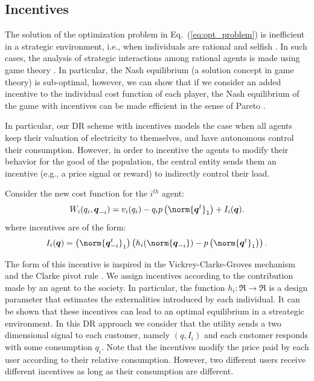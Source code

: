 \documentclass[a4paper,10pt]{article}
\newcommand{\bs}[1]{\boldsymbol{#1}}
\begin{document}
\subsection{Incentives}

The solution of the optimization problem in Eq.~(\ref{eq:opt_problem}) is inefficient in a strategic environment, i.e., when individuals are rational and selfish \cite{barreto_cdc, Johari09}. In such cases, the analysis of strategic interactions among rational agents is made using game theory \cite{fudenberg98}.
In particular, the Nash equilibrium (a solution concept in game theory)  is sub-optimal, however, we can show that if we consider an added incentive to the individual cost function of each player, the Nash equilibrium of the game with incentives can be made efficient in the sense of Pareto \cite{barreto_cdc}. 

In particular, our DR scheme with incentives models the case when all agents keep their valuation of electricity to themselves, and have autonomous control their consumption. However, in order to incentive the agents to modify their behavior for the good of the population, the central entity sends them an incentive (e.g., a price signal or reward) to indirectly control their load.

Consider the new cost function for the $i^{th}$ agent:
\begin{equation}\label{eq:game2}
W_i(q_i,\bs{q}_{-i}) 
= v_i(q_i) -  q_i p\left( \norm{\bs{q}^t}_1 \right) + I_i(\bs{q}) .
\end{equation}
where incentives are of the form:
\begin{equation}\label{eq:I_i}
I_i(\bs{q}) = \left( \norm{\bs{q}_{-i}^t}_1\right) \left( h_i(\norm{\bs{q}_{-i}})  - p\left( \norm{\bs{q}^t}_1 \right) \right).
\end{equation}


The form of this incentive is inspired in the 
Vickrey-Clarke-Groves mechanism and the  Clarke pivot rule \cite{AlgorithmicG}.
%
We assign incentives according to the contribution made by an agent 
to the society. In particular, the function $h_i:\Re \to \Re$ is a design parameter that estimates the externalities introduced by each individual.
It can be shown that these incentives can lead to an optimal equilibrium in a streategic environment.
In this DR approach we consider that the utility sends a two dimensional signal to each customer, namely $(q,I_i)$ and each customer responds with some consumption $q_i$. 
Note that the incentives modify the price paid by each user according to their relative consumption. However, two different users receive different incentives as long as their consumption are different.
\end{document}
